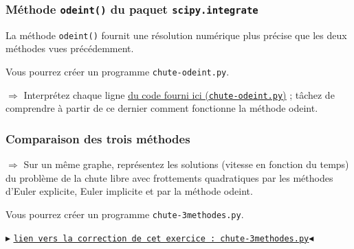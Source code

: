 \documentclass[11pt]{article}
\begin{document}
 
 
 
 
 
 
 \subsubsection{Méthode \texttt{odeint()} du paquet \texttt{scipy.integrate}}
 
 La méthode \texttt{odeint()} fournit une résolution numérique plus précise que les deux méthodes vues précédemment.
 
 \smallskip
 
 

Vous pourrez créer un programme \texttt{chute-odeint.py}.

\smallskip


 
 $\Longrightarrow$ Interprétez chaque ligne \href{https://github.com/formationPythonPC-Juin/corrections-formation/blob/master/chute-odeint.py}{\underline{du code fourni ici (\texttt{chute-odeint.py})}} ; tâchez de comprendre à partir de ce dernier comment fonctionne la méthode odeint.
 
 
 
 
 
 
 
 \subsubsection{Comparaison des trois méthodes}
 
 
 $\Longrightarrow$ Sur un même graphe, représentez les solutions (vitesse en fonction du temps) du problème de la chute libre avec frottements quadratiques par les méthodes d'Euler explicite, Euler implicite et par la méthode odeint.
  
  
  
  

\smallskip

Vous pourrez créer un programme \texttt{chute-3methodes.py}.

\smallskip


 
\begin{center}
$\blacktriangleright$ \href{https://github.com/formationPythonPC/corrections-formation/blob/master/chute-3methodes.py}{\underline{\texttt{lien vers la correction de cet exercice : chute-3methodes.py}}}$\blacktriangleleft$                                                                                                                                                                    \end{center}
\end{document}
